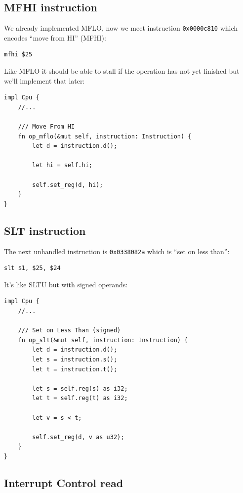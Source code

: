 \documentclass[a4paper]{article}
\newcommand{\code}[1] {\texttt{#1}}
\begin{document}
\subsection{MFHI instruction}

We already implemented MFLO, now we meet instruction \code{0x0000c810}
which encodes ``move from HI'' (MFHI):

\begin{lstlisting}[language=assembly]
mfhi $25
\end{lstlisting}

Like MFLO it should be able to stall if the operation has not yet
finished but we'll implement that later:

\begin{lstlisting}
impl Cpu {
    //...

    /// Move From HI
    fn op_mflo(&mut self, instruction: Instruction) {
        let d = instruction.d();

        let hi = self.hi;

        self.set_reg(d, hi);
    }
}
\end{lstlisting}

\subsection{SLT instruction}

The next unhandled instruction is \code{0x0338082a} which is ``set on
less than'':

\begin{lstlisting}[language=assembly]
slt $1, $25, $24
\end{lstlisting}

It's like SLTU but with signed operands:

\begin{lstlisting}
impl Cpu {
    //...

    /// Set on Less Than (signed)
    fn op_slt(&mut self, instruction: Instruction) {
        let d = instruction.d();
        let s = instruction.s();
        let t = instruction.t();

        let s = self.reg(s) as i32;
        let t = self.reg(t) as i32;

        let v = s < t;

        self.set_reg(d, v as u32);
    }
}
\end{lstlisting}

\subsection{Interrupt Control read}
\end{document}
